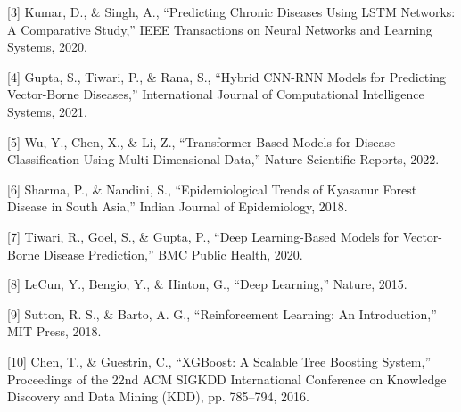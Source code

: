\documentclass[conference]{IEEEtran}
\begin{document}
[3] Kumar, D., \& Singh, A., “Predicting Chronic Diseases Using LSTM Networks: A Comparative Study,” IEEE Transactions on Neural Networks and Learning Systems, 2020.

[4] Gupta, S., Tiwari, P., \& Rana, S., “Hybrid CNN-RNN Models for Predicting Vector-Borne Diseases,” International Journal of Computational Intelligence Systems, 2021.

[5] Wu, Y., Chen, X., \& Li, Z., “Transformer-Based Models for Disease Classification Using Multi-Dimensional Data,” Nature Scientific Reports, 2022.

[6] Sharma, P., \& Nandini, S., “Epidemiological Trends of Kyasanur Forest Disease in South Asia,” Indian Journal of Epidemiology, 2018.

[7] Tiwari, R., Goel, S., \& Gupta, P., “Deep Learning-Based Models for Vector-Borne Disease Prediction,” BMC Public Health, 2020.

[8] LeCun, Y., Bengio, Y., \& Hinton, G., “Deep Learning,” Nature, 2015.

[9] Sutton, R. S., \& Barto, A. G., “Reinforcement Learning: An Introduction,” MIT Press, 2018.

[10] Chen, T., \& Guestrin, C., “XGBoost: A Scalable Tree Boosting System,” Proceedings of the 22nd ACM SIGKDD International Conference on Knowledge Discovery and Data Mining (KDD), pp. 785–794, 2016.
\end{document}
